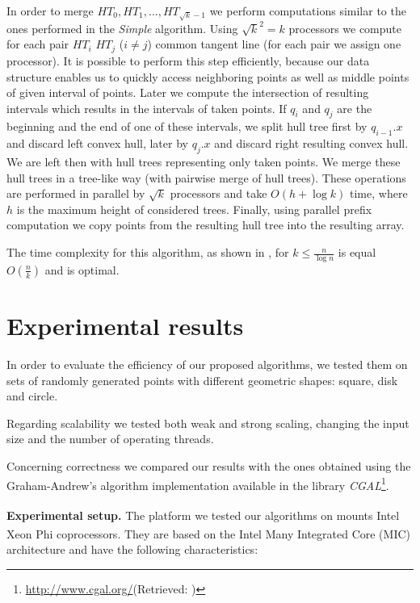 \documentclass[letterpaper]{article}
\newcommand{\mypar}[1]{{\bf #1.}}
\theoremstyle{definition}
\begin{document}
In order to merge $HT_0, HT_1, ..., HT_{\sqrt{k} - 1}$ we perform computations similar to the ones performed in the \textit{Simple} algorithm.
Using $\sqrt{k}^2 = k$ processors we compute for each pair $HT_i$ $HT_j$ ($i \neq j$) common tangent line (for each pair we assign one processor).
It is possible to perform this step efficiently, because our data structure enables us to quickly access neighboring points as well as middle points of given interval of points.
Later we compute the intersection of resulting intervals which results in the intervals of taken points.
If $q_i$ and $q_j$ are the beginning and the end of one of these intervals, we split hull tree first by $q_{i-1}.x$ and discard left convex hull, later by $q_j.x$ and discard right resulting convex hull.
We are left then with hull trees representing only taken points.
We merge these hull trees in a tree-like way (with pairwise merge of hull trees).
These operations are performed in parallel by $\sqrt{k}$ processors and take $O(h + \log k)$ time, where $h$ is the maximum height of considered trees.
Finally, using parallel prefix computation we copy points from the resulting hull tree into the resulting array.

The time complexity for this algorithm, as shown in \cite{HullTree}, for $k \leq \frac{n}{\log n}$ is equal $O(\frac{n}{k})$ and is optimal.

\section{Experimental results}\label{sec:exp}

In order to evaluate the efficiency of our proposed algorithms, we tested them on sets of randomly generated points with different geometric shapes: square, disk and circle.

Regarding scalability we tested both weak and strong scaling, changing the input size and the number of operating threads.

Concerning correctness we compared our results with the ones obtained using the Graham-Andrew's algorithm implementation available in the library \textit{CGAL}\footnote{\url{http://www.cgal.org/}(Retrieved: )}.

\mypar{Experimental setup}
The platform we tested our algorithms on mounts Intel\textsuperscript{\textregistered} Xeon Phi coprocessors. They are based on the Intel\textsuperscript{\textregistered} Many Integrated Core (MIC) architecture and have the following characteristics:
\end{document}
